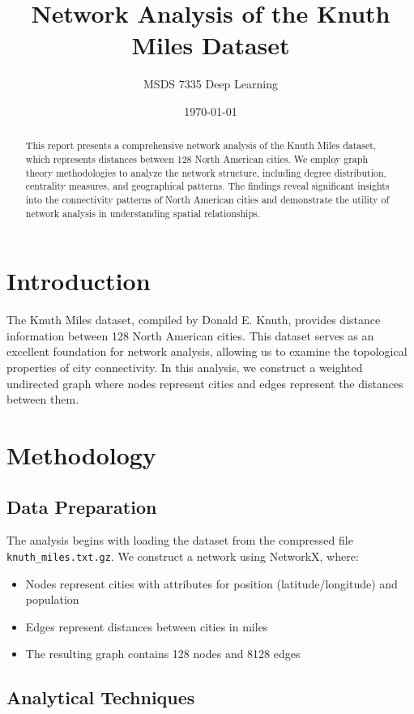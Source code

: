 \documentclass{article}
\title{Network Analysis of the Knuth Miles Dataset}
\author{MSDS 7335 Deep Learning}
\date{\today}
\begin{document}
\maketitle

\begin{abstract}
This report presents a comprehensive network analysis of the Knuth Miles dataset, which represents distances between 128 North American cities. We employ graph theory methodologies to analyze the network structure, including degree distribution, centrality measures, and geographical patterns. The findings reveal significant insights into the connectivity patterns of North American cities and demonstrate the utility of network analysis in understanding spatial relationships.
\end{abstract}

\section{Introduction}

The Knuth Miles dataset, compiled by Donald E. Knuth, provides distance information between 128 North American cities. This dataset serves as an excellent foundation for network analysis, allowing us to examine the topological properties of city connectivity. In this analysis, we construct a weighted undirected graph where nodes represent cities and edges represent the distances between them.

\section{Methodology}

\subsection{Data Preparation}

The analysis begins with loading the dataset from the compressed file \texttt{knuth\_miles.txt.gz}. We construct a network using NetworkX, where:
\begin{itemize}
    \item Nodes represent cities with attributes for position (latitude/longitude) and population
    \item Edges represent distances between cities in miles
    \item The resulting graph contains 128 nodes and 8128 edges
\end{itemize}

\subsection{Analytical Techniques}
\end{document}
